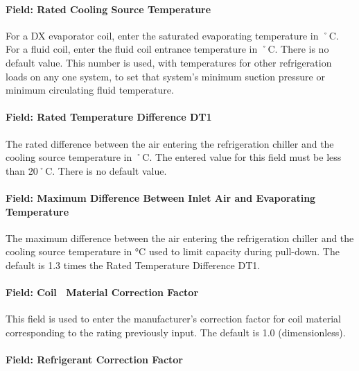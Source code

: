 \paragraph{Field: Rated Cooling Source Temperature}\label{field-rated-cooling-source-temperature-1}

For a DX evaporator coil, enter the saturated evaporating temperature in ˚C.~ For a fluid coil, enter the fluid coil entrance temperature in ˚C. There is no default value. This number is used, with temperatures for other refrigeration loads on any one system, to set that system's minimum suction pressure or minimum circulating fluid temperature.

\paragraph{Field: Rated Temperature Difference DT1}\label{field-rated-temperature-difference-dt1}

The rated difference between the air entering the refrigeration chiller and the cooling source temperature in ˚C. The entered value for this field must be less than 20˚C. There is no default value.

\paragraph{Field: Maximum Difference Between Inlet Air and Evaporating Temperature}\label{field-maximum-difference-between-inlet-air-and-evaporating-temperature}

The maximum difference between the air entering the refrigeration chiller and the cooling source temperature in °C used to limit capacity during pull-down. The default is 1.3 times the Rated Temperature Difference DT1.

\paragraph{Field: Coil~ Material Correction Factor}\label{field-coil-material-correction-factor}

This field is used to enter the manufacturer's correction factor for coil material corresponding to the rating previously input. The default is 1.0 (dimensionless).

\paragraph{Field: Refrigerant Correction Factor}\label{field-refrigerant-correction-factor}

